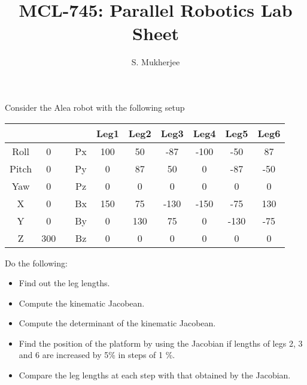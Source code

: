 \documentclass[10pt]{article}
\title{MCL-745: Parallel Robotics Lab Sheet}
\author{S. Mukherjee}
\begin{document}
\maketitle
Consider the Alea robot with the following setup

\begin{center}
\begin{tabular}{c c c c c c c c c c}
	\hline 
	&  &  &  & Leg1 & Leg2 & Leg3 & Leg4 & Leg5 & Leg6 \\ 
	\hline 
	Roll & 0 &  & Px & 100 & 50 & -87 & -100 & -50 & 87 \\ 
	Pitch & 0 &  & Py & 0 & 87 & 50 & 0 & -87 & -50 \\ 
	Yaw & 0 &  & Pz & 0 & 0 & 0 & 0 & 0 & 0 \\ 
	X & 0 &  & Bx & 150 & 75 & -130 & -150 & -75 & 130 \\ 
	Y & 0 &  & By & 0 & 130 & 75 & 0 & -130 & -75 \\ 
	Z & 300 &  & Bz & 0 & 0 & 0 & 0 & 0 & 0 \\ 
	\hline 
\end{tabular} 
\end{center}

\vspace{15mm}


Do the following:
\begin{itemize}
	\item Find out the leg lengths.
	\item Compute the kinematic Jacobean.
	\item Compute the determinant of the kinematic Jacobean.
	\item Find the position of the platform by using the Jacobian if lengths of legs 2, 3 and  6 are increased by 5\% in steps of 1 \%.
	\item Compare the leg lengths at each step with that obtained by the Jacobian.
\end{itemize}
\end{document}
